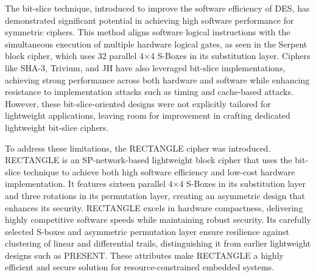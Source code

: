 \documentclass[journal=tosc,preprint]{iacrtrans}
\begin{document}
The bit-slice technique, introduced to improve the software efficiency of DES, has demonstrated significant potential in achieving high software performance for symmetric ciphers. This method aligns software logical instructions with the simultaneous execution of multiple hardware logical gates, as seen in the Serpent block cipher, which uses 32 parallel 4×4 S-Boxes in its substitution layer. Ciphers like SHA-3, Trivium, and JH have also leveraged bit-slice implementations, achieving strong performance across both hardware and software while enhancing resistance to implementation attacks such as timing and cache-based attacks. However, these bit-slice-oriented designs were not explicitly tailored for lightweight applications, leaving room for improvement in crafting dedicated lightweight bit-slice ciphers.

To address these limitations, the RECTANGLE cipher was introduced. RECTANGLE is an SP-network-based lightweight block cipher that uses the bit-slice technique to achieve both high software efficiency and low-cost hardware implementation. It features sixteen parallel 4×4 S-Boxes in its substitution layer and three rotations in its permutation layer, creating an asymmetric design that enhances its security. RECTANGLE excels in hardware compactness, delivering highly competitive software speeds while maintaining robust security. Its carefully selected S-boxes and asymmetric permutation layer ensure resilience against clustering of linear and differential trails, distinguishing it from earlier lightweight designs such as PRESENT. These attributes make RECTANGLE a highly efficient and secure solution for resource-constrained embedded systems.
\end{document}
